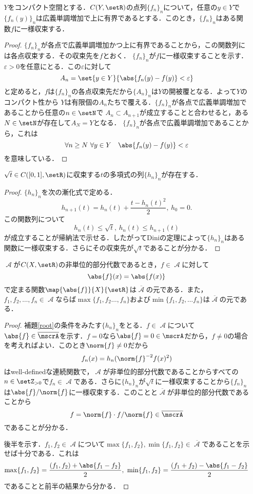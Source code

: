 \documentclass[uplatex]{jsarticle}
\begin{document}
\begin{proposition}[Diniの定理]
$Y$をコンパクト空間とする．$C(Y,\setR)$の点列$\{f_n\}_n$について，任意の$y\in Y$で$\{f_n(y)\}_n$は広義単調増加で上に有界であるとする．このとき，$\{f_n\}_n$はある関数$f$に一様収束する．
\end{proposition}
\begin{proof}
	$\{f_n\}_n$が各点で広義単調増加かつ上に有界であることから，この関数列には各点収束する．その収束先を$f$とおく．
	$\{f_n\}_n$が$f$に一様収束することを示す．$\varepsilon>0$を任意にとる．この$\varepsilon$に対して
		\[A_n=\set{y\in Y}{\abs{f_n(y)-f(y)} < \varepsilon} \]
	と定めると，$f$は$\{f_n\}_n$の各点収束先だから$\{A_n\}_n$は$Y$の開被覆となる．よって$Y$のコンパクト性から
	$Y$は有限個の$A_n$たちで覆える．$\{f_n\}_n$が各点で広義単調増加であることから任意の$n\in \setN$で
	$A_n\subset A_{n+1}$が成立することと合わせると，ある$N\in \setN$が存在して$A_N=Y$となる．
	$\{f_n\}_n$が各点で広義単調増加であることから，これは
		\[\forall n\geq N\ \forall y\in Y\quad \abs{f_n(y)-f(y)} < \varepsilon\]
	を意味している．
\end{proof}

\begin{lemma}\label{root}
$\sqrt{t}\in C([0,1],\setR)$に収束する$t$の多項式の列$\{h_n\}_n$が存在する．
\end{lemma}
\begin{proof}
$\{h_n\}_n$を次の漸化式で定める．
\[ h_{n+1}(t) = h_n(t) + \frac{t-h_n(t)^2}{2},\ h_0=0. \]
この関数列について
\[ h_n(t)\leq \sqrt{t},\  h_n(t)\leq h_{n+1}(t) \]
が成立することが帰納法で示せる．したがってDiniの定理によって$\{h_n\}_n$はある関数に一様収束する．さらにその収束先が$\sqrt{t}$であることが分かる．
\end{proof}

\begin{lemma}
$\mscrA$が$C(X,\setR)$の非単位的部分代数であるとき，$f\in \mscrA$に対して
\[ \abs{f}(x) = \abs{f(x)} \]
で定まる関数$\map{\abs{f}}{X}{\setR}$は$\overline{\mscrA}$の元である．また，$f_1,f_2,\dots,f_n\in \mscrA$ならば$\max\{f_1,f_2\dots,f_n\}$および$\min\{f_1,f_2,\dots f_n\}$は$\overline{\mscrA}$の元である．
\end{lemma}
\begin{proof}
補題\ref{root}の条件をみたす$\{h_n\}_n$をとる．$f\in \mscrA$について$\abs{f}\in\overline{\mscrA}$を示す．$f=0$なら$\abs{f}=0\in\mscrA$だから，$f\neq 0$の場合を考えればよい．このとき$\norm{f}\neq 0$だから
\[ f_n(x) = h_n(\norm{f}^{-2}f(x)^2) \]
はwell-definedな連続関数で，$\mscrA$が非単位的部分代数であることからすべての$n\in \setZ_{>0}$で$f_n\in \mscrA$である．さらに$\{h_n\}_n$が$\sqrt{t}$に一様収束することから$\{f_n\}_n$は$\abs{f}/\norm{f}$に一様収束する．このことと$\overline{\mscrA}$が非単位的部分代数であることから
\[ f = \norm{f}\cdot f/\norm{f}\in \overline{\mscrA} \]
であることが分かる．

後半を示す．$f_1,f_2\in \mscrA$について$\max\{f_1,f_2\},\min\{f_1,f_2\}\in \overline{\mscrA}$であることを示せば十分である．これは
\[ \max\{f_1,f_2\} = \frac{(f_1,f_2)+\abs{f_1-f_2}}{2},\ \min\{f_1,f_2\} = \frac{(f_1+f_2)-\abs{f_1-f_2}}{2} \]
であることと前半の結果から分かる．
\end{proof}
\end{document}
